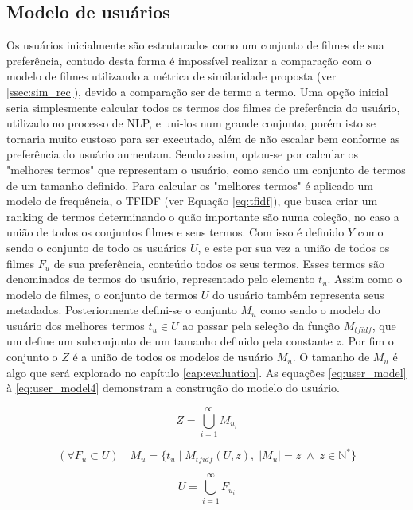 \subsection{Modelo de usuários}
\label{ssec:user_model}

Os usuários inicialmente são estruturados como um conjunto de filmes de sua preferência, contudo desta forma é impossível realizar a comparação com o modelo de filmes utilizando a métrica de similaridade proposta (ver \ref{ssec:sim_rec}), devido a comparação ser de termo a termo. Uma opção inicial seria simplesmente calcular todos os termos dos filmes de preferência do usuário, utilizado no processo de \ac{NLP}, e uni-los num grande conjunto, porém isto se tornaria muito custoso para ser executado, além de não escalar bem conforme as preferência do usuário aumentam. Sendo assim, optou-se por calcular os "melhores termos" que representam o usuário, como sendo um conjunto de termos de um tamanho definido. Para calcular os "melhores termos" é aplicado um modelo de frequência, o \ac{TFIDF} (ver Equação \ref{eq:tfidf}), que busca criar um ranking de termos determinando o quão importante são numa coleção, no caso a união de todos os conjuntos filmes e seus termos. Com isso é definido $Y$ como sendo o conjunto de todo os usuários $U$, e este por sua vez a união de todos os filmes $F_u$ de sua preferência, conteúdo todos os seus termos. Esses termos são denominados de termos do usuário, representado pelo elemento $t_u$. Assim como o modelo de filmes, o conjunto de termos $U$ do usuário também representa seus metadados. Posteriormente defini-se o conjunto $M_u$ como sendo o modelo do usuário dos melhores termos $t_u \in U$ ao passar pela seleção da função $M_{tfidf}$, que um define um subconjunto de um tamanho definido pela constante $z$. Por fim o conjunto o $Z$ é a união de todos os modelos de usuário $M_u$. O tamanho de $M_u$ é algo que será explorado no capítulo \ref{cap:evaluation}. As equações \ref{eq:user_model} à \ref{eq:user_model4} demonstram a construção do modelo do usuário.

\begin{equation}
	Z = \bigcup\limits_{i=1}^{\infty} M_{u_i}
\label{eq:user_model}
\end{equation}

\begin{equation}
	(\forall F_u \subset U) \quad M_u = \{t_u \;| \; M_{tfidf}(U, z), \; |M_u| = z \; \land \; z \in \mathbb{N}^*\}
\end{equation}

\begin{equation}
	U = \bigcup\limits_{i=1}^{\infty} F_{u_i}
\label{eq:user_model4}
\end{equation}

